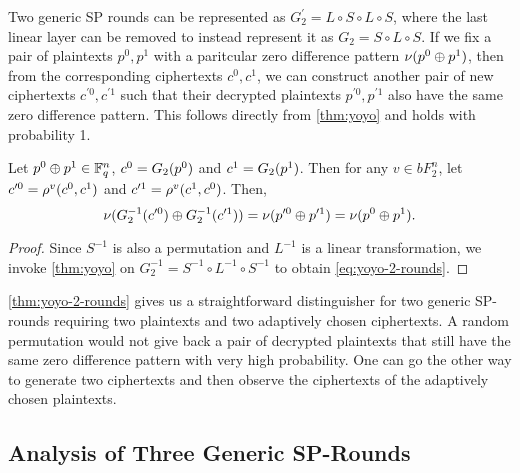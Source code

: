\documentclass[twoside]{article}
\begin{document}
Two generic SP rounds can be represented as \(G_2^\prime = L \circ S \circ L
\circ S\), where the last linear layer can be removed to instead represent it as
\(G_2 = S \circ L \circ S\). If we fix a pair of plaintexts \(p^0, p^1\) with a
paritcular zero difference pattern \(\nu(p^0 \oplus p^1)\), then from the
corresponding ciphertexts \(c^0, c^1\), we can construct another pair of new
ciphertexts \(c^{\prime 0}, c^{\prime 1}\) such that their decrypted plaintexts
\(p^{\prime 0}, p^{\prime 1}\) also have the same zero difference pattern. This
follows directly from \autoref{thm:yoyo} and holds with probability 1.

\begin{theorem}
    \label{thm:yoyo-2-rounds}
    Let \(p^0 \oplus p^1 \in \mathbb F_q^n\), \(c^0 = G_2(p^0)\) and \(c^1 =
    G_2(p^1)\). Then for any \(v \in bF_2^n\), let \(c^{\prime 0} =
    \rho^v(c^0, c^1)\) and \(c^{\prime 1} = \rho^v(c^1, c^0)\). Then,
    \begin{equation}
        \nu(G_2^{-1}(c^{\prime 0}) \oplus G_2^{-1}(c^{\prime 1})) = \nu(p^{\prime 0} \oplus p^{\prime 1}) = \nu(p^0 \oplus p^1).
        \label{eq:yoyo-2-rounds}
    \end{equation}
\end{theorem}
\begin{proof}
    Since \(S^{-1}\) is also a permutation and \(L^{-1}\) is a linear
    transformation, we invoke \autoref{thm:yoyo} on \(G_2^{-1} = S^{-1} \circ
    L^{-1} \circ S^{-1}\) to obtain \eqref{eq:yoyo-2-rounds}.
\end{proof}

\autoref{thm:yoyo-2-rounds} gives us a straightforward distinguisher for two
generic SP-rounds requiring two plaintexts and two adaptively chosen
ciphertexts. A random permutation would not give back a pair of decrypted
plaintexts that still have the same zero difference pattern with very high
probability. One can go the other way to generate two ciphertexts and then
observe the ciphertexts of the adaptively chosen plaintexts.

\subsection{Analysis of Three Generic SP-Rounds}
\end{document}
